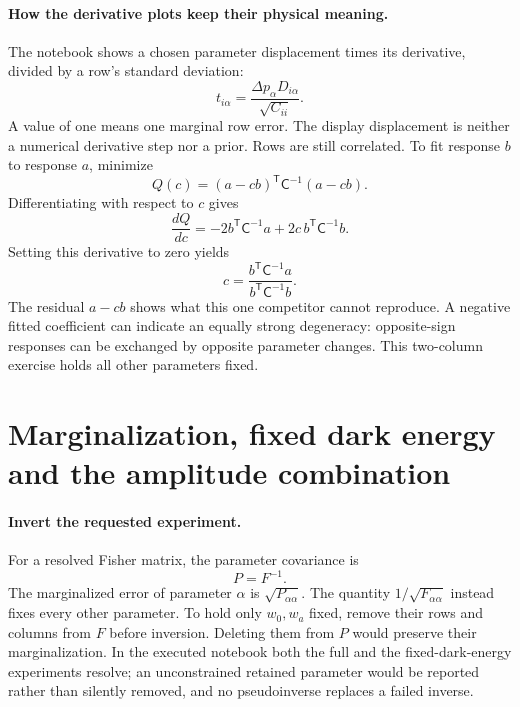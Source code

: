 \documentclass[11pt]{article}
\newcommand{\Cov}{\mathsf C}
\newcommand{\T}{^{\mathsf T}}
\begin{document}
\paragraph{How the derivative plots keep their physical meaning.}
The notebook shows a chosen parameter displacement times its derivative,
divided by a row's standard deviation:
\begin{equation}
 t_{i\alpha}=\frac{\Delta p_\alpha D_{i\alpha}}{\sqrt{C_{ii}}}.
\end{equation}
A value of one means one marginal row error. The display displacement is
neither a numerical derivative step nor a prior. Rows are still correlated.
To fit response $b$ to response $a$, minimize
\begin{equation}
 Q(c)=(a-cb)\T\Cov^{-1}(a-cb).
\end{equation}
Differentiating with respect to $c$ gives
\begin{equation}
 \frac{dQ}{dc}=-2b\T\Cov^{-1}a+2c\,b\T\Cov^{-1}b.
\end{equation}
Setting this derivative to zero yields
\begin{equation}
 c=\frac{b\T\Cov^{-1}a}{b\T\Cov^{-1}b}.
\end{equation}
The residual $a-cb$ shows what this one competitor cannot reproduce.
A negative fitted coefficient can indicate an equally strong degeneracy:
opposite-sign responses can be exchanged by opposite parameter changes.
This two-column exercise holds all other parameters fixed.

\section{Marginalization, fixed dark energy and the amplitude combination}
\paragraph{Invert the requested experiment.}
For a resolved Fisher matrix, the parameter covariance is
\begin{equation}
 P=F^{-1}.
\end{equation}
The marginalized error of parameter $\alpha$ is $\sqrt{P_{\alpha\alpha}}$.
The quantity $1/\sqrt{F_{\alpha\alpha}}$ instead fixes every other
parameter. To hold only $w_0,w_a$ fixed, remove their rows and columns from
$F$ before inversion. Deleting them from $P$ would preserve their
marginalization. In the executed notebook both the full and the fixed-dark-energy
experiments resolve; an unconstrained retained parameter would be reported
rather than silently removed, and no pseudoinverse replaces a failed
inverse.
\end{document}
